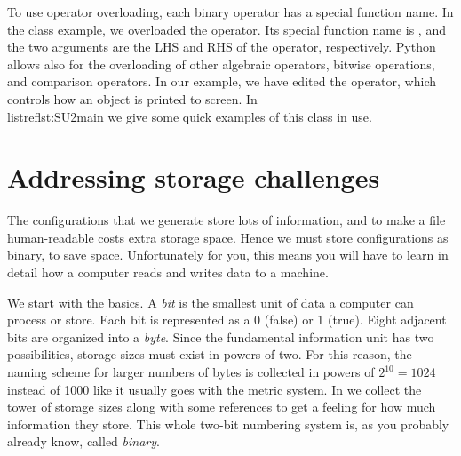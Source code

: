 \begin{code*}
\caption{Example main code utilizing the  class
of \\listref{lst:SU2}.}
\label{lst:SU2main}
\end{code*}
\begin{code*}
\caption{Output from \\listref{lst:SU2main}.}
\end{code*}

To use operator overloading, each binary operator has a special function name.
In the  class example, we overloaded the \ff{+} operator. Its special
function name is , and the two arguments are the LHS and
RHS of the operator, respectively. Python allows also for the overloading
of other algebraic operators, bitwise operations, and comparison operators.
In our example, we have edited the  operator, which
controls how an  object is printed to screen.
In \\listref{lst:SU2main} we give some quick examples of 
this  class in use. 


\section{Addressing storage challenges}

The configurations that we generate store lots of information, and to make a
file human-readable costs extra storage space. Hence we must store
configurations as binary, to save space. Unfortunately for you,
this means you will have to learn in detail how a computer reads and writes data
to a machine.

We start with the basics. A {\it bit} is the smallest unit of data a computer
can process or store. Each bit is represented as a 0 (false) or 1 (true).
Eight adjacent bits are organized into a {\it byte}.
Since the fundamental information unit has two possibilities, storage
sizes must exist in powers of two. For this reason, the naming scheme
for larger numbers of bytes is collected in powers of $2^{10}=1024$
instead of 1000 like it usually goes with the metric system.
In  we collect the tower of storage sizes
along with some references to get a feeling for how much information
they store. This whole two-bit numbering system is, as you probably
already know, called {\it binary}.

